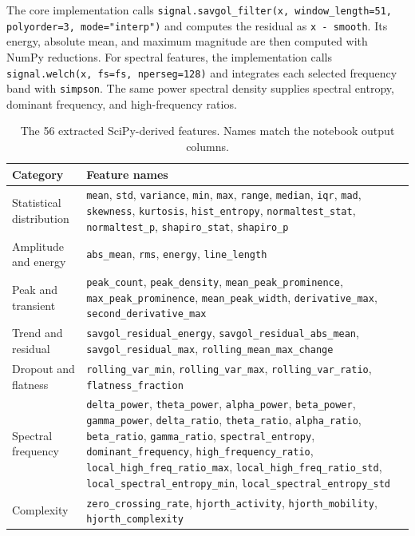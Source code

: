 The core implementation calls
\texttt{signal.savgol\_filter(x, window\_length=51, polyorder=3,
mode="interp")} and computes the residual as \texttt{x - smooth}. Its energy,
absolute mean, and maximum magnitude are then computed with NumPy reductions.
For spectral features, the implementation calls
\texttt{signal.welch(x, fs=fs, nperseg=128)} and integrates each selected
frequency band with \texttt{simpson}. The same power spectral density supplies
spectral entropy, dominant frequency, and high-frequency ratios.

\begin{table}[htbp]
\centering
\caption{The 56 extracted SciPy-derived features. Names match the notebook output columns.}
\label{tab:feature-list}
\small
\begin{tabular}{p{}p{}}
\toprule
\textbf{Category} & \textbf{Feature names} \\
\midrule
Statistical distribution &
\texttt{mean}, \texttt{std}, \texttt{variance}, \texttt{min}, \texttt{max},
\texttt{range}, \texttt{median}, \texttt{iqr}, \texttt{mad},
\texttt{skewness}, \texttt{kurtosis}, \texttt{hist\_entropy},
\texttt{normaltest\_stat}, \texttt{normaltest\_p},
\texttt{shapiro\_stat}, \texttt{shapiro\_p} \\
Amplitude and energy &
\texttt{abs\_mean}, \texttt{rms}, \texttt{energy}, \texttt{line\_length} \\
Peak and transient &
\texttt{peak\_count}, \texttt{peak\_density},
\texttt{mean\_peak\_prominence}, \texttt{max\_peak\_prominence},
\texttt{mean\_peak\_width}, \texttt{derivative\_max},
\texttt{second\_derivative\_max} \\
Trend and residual &
\texttt{savgol\_residual\_energy}, \texttt{savgol\_residual\_abs\_mean},
\texttt{savgol\_residual\_max}, \texttt{rolling\_mean\_max\_change} \\
Dropout and flatness &
\texttt{rolling\_var\_min}, \texttt{rolling\_var\_max},
\texttt{rolling\_var\_ratio}, \texttt{flatness\_fraction} \\
Spectral frequency &
\texttt{delta\_power}, \texttt{theta\_power}, \texttt{alpha\_power},
\texttt{beta\_power}, \texttt{gamma\_power}, \texttt{delta\_ratio},
\texttt{theta\_ratio}, \texttt{alpha\_ratio}, \texttt{beta\_ratio},
\texttt{gamma\_ratio}, \texttt{spectral\_entropy},
\texttt{dominant\_frequency}, \texttt{high\_frequency\_ratio},
\texttt{local\_high\_freq\_ratio\_max},
\texttt{local\_high\_freq\_ratio\_std},
\texttt{local\_spectral\_entropy\_min},
\texttt{local\_spectral\_entropy\_std} \\
Complexity &
\texttt{zero\_crossing\_rate}, \texttt{hjorth\_activity},
\texttt{hjorth\_mobility}, \texttt{hjorth\_complexity} \\
\bottomrule
\end{tabular}
\end{table}

